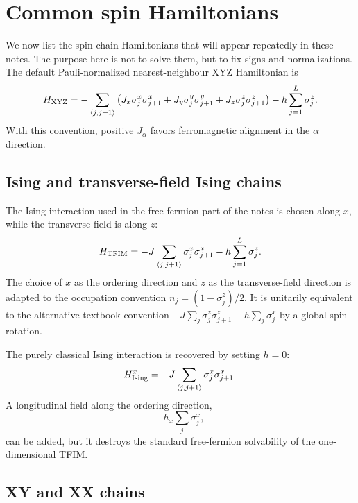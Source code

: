 \section{Common spin Hamiltonians}

We now list the spin-chain Hamiltonians that will appear repeatedly in these
notes. The purpose here is not to solve them, but to fix signs and normalizations.
The default Pauli-normalized nearest-neighbour XYZ Hamiltonian is
\begin{equation}
\label{eq:xyz-general-convention}
    H_{\rm XYZ}
    =
    -\sum_{\langle j,j+1\rangle}
    \left(
        J_x\sigma_j^x\sigma_{j+1}^x
        +
        J_y\sigma_j^y\sigma_{j+1}^y
        +
        J_z\sigma_j^z\sigma_{j+1}^z
    \right)
    -
    h\sum_{j=1}^{L}\sigma_j^z .
\end{equation}
With this convention, positive $J_\alpha$ favors ferromagnetic alignment in the
$\alpha$ direction.

\subsection{Ising and transverse-field Ising chains}

The Ising interaction used in the free-fermion part of the notes is chosen along
$x$, while the transverse field is along $z$:
\begin{equation}
\label{eq:tfim-convention-chapter}
    H_{\rm TFIM}
    =
    -J\sum_{\langle j,j+1\rangle}\sigma_j^x\sigma_{j+1}^x
    -
    h\sum_{j=1}^{L}\sigma_j^z .
\end{equation}
The choice of $x$ as the ordering direction and $z$ as the transverse-field
direction is adapted to the occupation convention $n_j=(1-\sigma_j^z)/2$. It is
unitarily equivalent to the alternative textbook convention
$-J\sum_j\sigma_j^z\sigma_{j+1}^z-h\sum_j\sigma_j^x$ by a global spin rotation.

The purely classical Ising interaction is recovered by setting $h=0$:
\begin{equation}
    H_{\rm Ising}^{x}
    =
    -J\sum_{\langle j,j+1\rangle}\sigma_j^x\sigma_{j+1}^x .
\end{equation}
A longitudinal field along the ordering direction,
\begin{equation}
    -h_x\sum_j\sigma_j^x,
\end{equation}
can be added, but it destroys the standard free-fermion solvability of the
one-dimensional TFIM.

\subsection{XY and XX chains}

